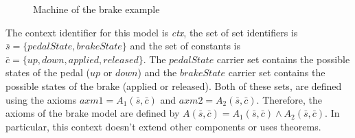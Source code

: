\begin{figure}[h]
    \quad
    \caption{Machine of the brake example}
    \label{fig:brake2}
\end{figure}
The context identifier for this model is \textit{ctx}, the set of set identifiers is $\bar{s} = \{pedalState, brakeState\}$ and the set of constants is $\bar{c} = \{up, down, applied, released \}$. The $pedalState$ carrier set contains the possible states of the pedal ($up$ or $down$) and the $brakeState$ carrier set contains the possible states of the brake (applied or released). Both of these sets, are defined using the axioms $axm1 = A_1(\bar{s},\bar{c})$ and $axm2 = A_2(\bar{s},\bar{c})$. Therefore, the axioms of the brake model are defined by $A(\bar{s},\bar{c}) = A_1(\bar{s},\bar{c}) \land A_2(\bar{s},\bar{c})$. In particular, this context doesn't extend other components or uses theorems. 

